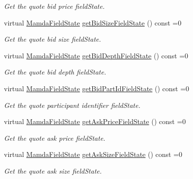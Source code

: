 \begin{CompactItemize}
\begin{CompactList}\small\item\em Get the quote bid price field\-State. \item\end{CompactList}\item 
virtual \hyperlink{namespaceWombat_93aac974f2ab713554fd12a1fa3b7d2a}{Mamda\-Field\-State} \hyperlink{classWombat_1_1MamdaQuoteRecap_4b6987d65c59397934287fa535968056}{get\-Bid\-Size\-Field\-State} () const =0
\begin{CompactList}\small\item\em Get the quote bid size field\-State. \item\end{CompactList}\item 
virtual \hyperlink{namespaceWombat_93aac974f2ab713554fd12a1fa3b7d2a}{Mamda\-Field\-State} \hyperlink{classWombat_1_1MamdaQuoteRecap_8b4a8fdf6c777bfe1ff3b2161e7b0c08}{get\-Bid\-Depth\-Field\-State} () const =0
\begin{CompactList}\small\item\em Get the quote bid depth field\-State. \item\end{CompactList}\item 
virtual \hyperlink{namespaceWombat_93aac974f2ab713554fd12a1fa3b7d2a}{Mamda\-Field\-State} \hyperlink{classWombat_1_1MamdaQuoteRecap_879a1c9f6eb10c6b0a78db53c8e2eb89}{get\-Bid\-Part\-Id\-Field\-State} () const =0
\begin{CompactList}\small\item\em Get the quote participant identifier field\-State. \item\end{CompactList}\item 
virtual \hyperlink{namespaceWombat_93aac974f2ab713554fd12a1fa3b7d2a}{Mamda\-Field\-State} \hyperlink{classWombat_1_1MamdaQuoteRecap_6cb34263f4aa84f8bdb1d04f13257ff1}{get\-Ask\-Price\-Field\-State} () const =0
\begin{CompactList}\small\item\em Get the quote ask price field\-State. \item\end{CompactList}\item 
virtual \hyperlink{namespaceWombat_93aac974f2ab713554fd12a1fa3b7d2a}{Mamda\-Field\-State} \hyperlink{classWombat_1_1MamdaQuoteRecap_3df7e1b094a7efebea3cf9c388de7611}{get\-Ask\-Size\-Field\-State} () const =0
\begin{CompactList}\small\item\em Get the quote ask size field\-State. \item\end{CompactList}\item 

\end{CompactItemize}
